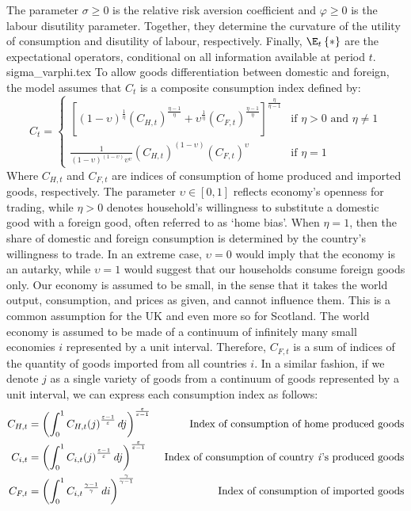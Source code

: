 The parameter $\sigma \geq 0$ is the relative risk aversion coefficient and $\varphi \geq 0$ is the labour disutility parameter. Together, they determine the curvature of the utility of consumption and disutility of labour, respectively. Finally, $\E_t\left\{*\right\}$ are the expectational operators, conditional on all information available at period $t$.
{sigma_varphi.tex}
To allow goods differentiation between domestic and foreign, the model assumes that $C_t$ is a composite consumption index defined by:
\begin{equation}
    C_t = 
    \begin{cases}
        \left[ (1-\upsilon)^\frac{1}{\eta} (C_{H,t})^{\frac{\eta-1}{\eta}} + \upsilon^{\frac{1}{\eta}}(C_{F,t})^{\frac{\eta-1}{\eta}}\right]^{\frac{\eta}{\eta-1}} & \text{if $\eta > 0$ and $\eta \ne 1$} \\
        \frac{1}{(1-\upsilon)^{(1-\upsilon)}\upsilon^\upsilon}(C_{H,t})^{(1-\upsilon)}(C_{F,t})^\upsilon & \text{if $\eta = 1$}
    \end{cases}
\end{equation}
Where $C_{H,t}$ and $C_{F,t}$ are indices of consumption of home produced and imported goods, respectively. The parameter $\upsilon \in [0,1]$ reflects economy's openness for trading, while $\eta > 0$ denotes household's willingness to substitute a domestic good with a foreign good, often referred to as `home bias'. When $\eta = 1$, then the share of domestic and foreign consumption is determined by the country's willingness to trade. In an extreme case, $\upsilon = 0$ would imply that the economy is an autarky, while $\upsilon = 1$ would suggest that our households consume foreign goods only. Our economy is assumed to be small, in the sense that it takes the world output, consumption, and prices as given, and cannot influence them. This is a common assumption for the UK and even more so for Scotland. The world economy is assumed to be made of a continuum of infinitely many small economies $i$ represented by a unit interval. Therefore, $C_{F,t}$ is a sum of indices of the quantity of goods imported from all countries $i$. In a similar fashion, if we denote $j$ as a single variety of goods from a continuum of goods represented by a unit interval, we can express each consumption index as follows: 
\begin{align*}
    C_{H,t} & = \left( \int_{0}^{1} {C_{H,t}(j)}^{\frac{\varepsilon-1}{\varepsilon}} \,dj  \right)^\frac{\varepsilon}{\varepsilon-1} & \text{ Index of consumption of home produced goods}                 \\
    C_{i,t} & = \left( \int_{0}^{1} {C_{i,t}(j)}^{\frac{\varepsilon-1}{\varepsilon}} \,dj  \right)^\frac{\varepsilon}{\varepsilon-1} & \text{ Index of consumption of country \textit{i}'s produced goods} \\
    C_{F,t} & = \left( \int_{0}^{1} {C_{i,t}}^{\frac{\gamma-1}{\gamma}} \,di  \right)^{\frac{\gamma}{\gamma-1}}                      & \text{ Index of consumption of imported goods}
\end{align*}

